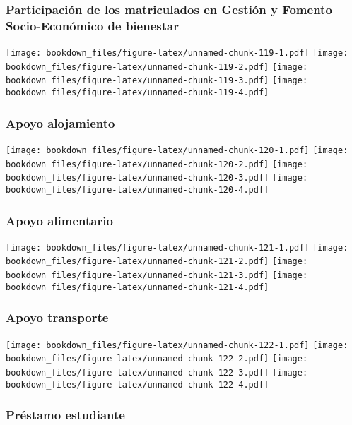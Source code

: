 \documentclass[]{article}
\theoremstyle{definition}
\theoremstyle{definition}
\theoremstyle{definition}
\theoremstyle{remark}
\begin{document}
\subsubsection{Participación de los matriculados en Gestión y Fomento
Socio-Económico de
bienestar}\label{participacion-de-los-matriculados-en-gestion-y-fomento-socio-economico-de-bienestar}

\texttt{[image: bookdown\_files/figure-latex/unnamed-chunk-119-1.pdf]}
\texttt{[image: bookdown\_files/figure-latex/unnamed-chunk-119-2.pdf]}
\texttt{[image: bookdown\_files/figure-latex/unnamed-chunk-119-3.pdf]}
\texttt{[image: bookdown\_files/figure-latex/unnamed-chunk-119-4.pdf]}

\subsubsection{Apoyo alojamiento}\label{apoyo-alojamiento}

\texttt{[image: bookdown\_files/figure-latex/unnamed-chunk-120-1.pdf]}
\texttt{[image: bookdown\_files/figure-latex/unnamed-chunk-120-2.pdf]}
\texttt{[image: bookdown\_files/figure-latex/unnamed-chunk-120-3.pdf]}
\texttt{[image: bookdown\_files/figure-latex/unnamed-chunk-120-4.pdf]}

\subsubsection{Apoyo alimentario}\label{apoyo-alimentario}

\texttt{[image: bookdown\_files/figure-latex/unnamed-chunk-121-1.pdf]}
\texttt{[image: bookdown\_files/figure-latex/unnamed-chunk-121-2.pdf]}
\texttt{[image: bookdown\_files/figure-latex/unnamed-chunk-121-3.pdf]}
\texttt{[image: bookdown\_files/figure-latex/unnamed-chunk-121-4.pdf]}

\subsubsection{Apoyo transporte}\label{apoyo-transporte}

\texttt{[image: bookdown\_files/figure-latex/unnamed-chunk-122-1.pdf]}
\texttt{[image: bookdown\_files/figure-latex/unnamed-chunk-122-2.pdf]}
\texttt{[image: bookdown\_files/figure-latex/unnamed-chunk-122-3.pdf]}
\texttt{[image: bookdown\_files/figure-latex/unnamed-chunk-122-4.pdf]}

\subsubsection{Préstamo estudiante}\label{prestamo-estudiante}
\end{document}
